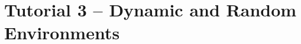 {
  \let\section\subsection
  \let\subsection\subsubsection
  \let\subsubsection\paragraph
  
  
  }

\section{Tutorial 3 -- Dynamic and Random Environments}

{
  \let\section\subsection
  \let\subsection\subsubsection
  \let\subsubsection\paragraph
  
  
}


